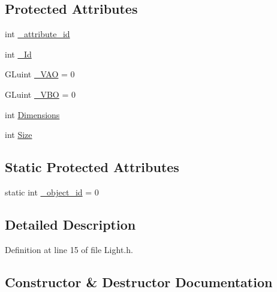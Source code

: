 \subsection*{Protected Attributes}
\begin{DoxyCompactItemize}
\item 
int \mbox{\hyperlink{classEngine_1_1Components_1_1Objects_1_1VertexObject_a401aa1eb0254e57d8295c2287749eed5}{\+\_\+attribute\+\_\+id}}
\item 
int \mbox{\hyperlink{classEngine_1_1Components_1_1Objects_1_1VertexObject_aa76ac755e9e37853a778795f0a0ad15e}{\+\_\+\+Id}}
\item 
G\+Luint \mbox{\hyperlink{classEngine_1_1Components_1_1Objects_1_1VertexObject_ae85ac9d5ded8f54d58feb7fb78e75130}{\+\_\+\+V\+AO}} = 0
\item 
G\+Luint \mbox{\hyperlink{classEngine_1_1Components_1_1Objects_1_1VertexObject_a79e171ffe4b9342d76c0c729a9836fd2}{\+\_\+\+V\+BO}} = 0
\item 
int \mbox{\hyperlink{classEngine_1_1Components_1_1Objects_1_1VertexObject_ae5bb104a878dc8a3c909ec9b0ee799c1}{Dimensions}}
\item 
int \mbox{\hyperlink{classEngine_1_1Components_1_1Objects_1_1VertexObject_a13ec6e4a92520bdd1b33ad6de757cb92}{Size}}
\end{DoxyCompactItemize}
\subsection*{Static Protected Attributes}
\begin{DoxyCompactItemize}
\item 
static int \mbox{\hyperlink{classEngine_1_1Components_1_1Objects_1_1VertexObject_aef076731df98a4806c644a3ac4400ae2}{\+\_\+object\+\_\+id}} = 0
\end{DoxyCompactItemize}


\subsection{Detailed Description}


Definition at line 15 of file Light.\+h.



\subsection{Constructor \& Destructor Documentation}
\mbox{\label{classLight_af33c52703fccd3142a2826893027884c}} 
